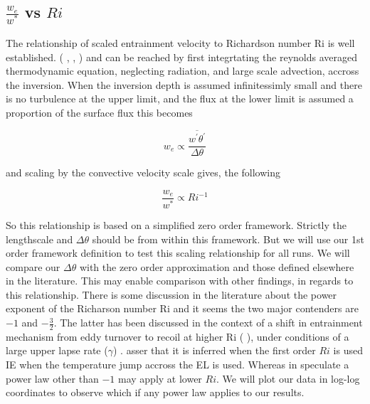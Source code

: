 \subsection{$\frac{w_{e}}{w^{*}}$ vs $Ri$}

The relationship of scaled entrainment velocity to Richardson number \acs{Ri} is well established.  (\citeauthor{Deardorff79} \cite{Deardorff79} \citeauthor{DearWill80}, \cite{DearWill80}, \citeauthor{Stull-BLMetIntro} \cite{Stull-BLMetIntro}) and can be reached by first integrtating the reynolds averaged thermodynamic equation, neglecting radiation, and large scale advection, accross the inversion.  When the inversion depth is assumed infinitessimly small and there is no turbulence at the upper limit, and the flux at the lower limit is assumed a proportion of the surface flux this becomes

\begin{equation}
w_{e} \propto \frac{\overline{w^{'}\theta^{'}}}{\Delta \theta}
\end{equation}

and scaling by the convective velocity scale gives, the following

\begin{equation}
\frac{w_{e}}{w^{*}} \propto Ri^{-1}
\end{equation}

So this relationship is based on a simplified zero order framework.  Strictly the lengthscale and $\Delta \theta$ should be from within this framework.  But we will use our 1st order framework definition to test this scaling relationship for all runs.  We will compare our $\Delta \theta$ with the zero order approximation and those defined elsewhere in the literature.  This may enable comparison with other findings, in regards to this relationship.  There is some discussion in the literature about the power exponent of the Richarson number \acs{Ri} and it seems the two major contenders are $-1$ and $-\frac{3}{2}$.  The latter has been discussed in the context of a shift in entrainment mechanism from eddy turnover to recoil at higher \acs{Ri} (\citeauthor{Turner86} \cite{Turner86}), under conditions of a large upper lapse rate ($\gamma$) \citeauthor{DearWill80} \cite{DearWill80}. \citeauthor{FedConzMir04} \cite{FedConzMir04} asser that it is inferred when the first order $Ri$ is used IE when the temperature jump accross the \acs{EL} is used. Whereas \citeauthor{SullMoengStev} in \cite{SullMoengStev} speculate a power law other than $-1$ may apply at lower $Ri$.  We will plot our data in log-log coordinates to observe which if any power law applies to our results.


